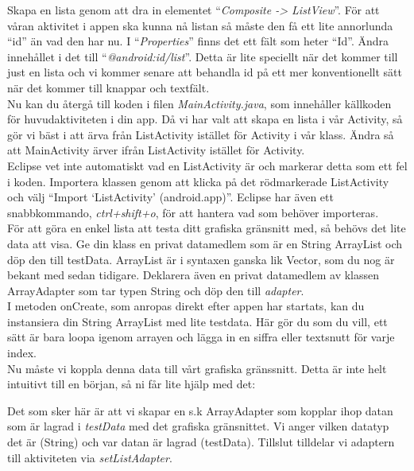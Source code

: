 \documentclass[11 pt, titlepage]{article} %
\begin{document}
Skapa en lista genom att dra in elementet “\textit{Composite -> ListView}”. För att våran aktivitet i appen ska kunna nå listan så måste den få ett lite annorlunda “id” än vad den har nu. I “\textit{Properties}” finns det ett fält som heter “Id”. Ändra innehållet i det till “\textit{@android:id/list}”. Detta är lite speciellt när det kommer till just en lista och vi kommer senare att behandla id på ett mer konventionellt sätt när det kommer till knappar och textfält.\\

Nu kan du återgå till koden i filen \textit{MainActivity.java}, som innehåller källkoden för huvudaktiviteten i din app.
Då vi har valt att skapa en lista i vår Activity, så gör vi bäst i att ärva från ListActivity istället för Activity i vår klass.
Ändra så att MainActivity ärver ifrån ListActivity istället för Activity. \\

Eclipse vet inte automatiskt vad en ListActivity är och markerar detta som ett fel i koden. Importera klassen genom att klicka på det rödmarkerade ListActivity och välj “Import ‘ListActivity’ (android.app)”. Eclipse har även ett snabbkommando, \textit{ctrl+shift+o}, för att hantera vad som behöver importeras.\\

För att göra en enkel lista att testa ditt grafiska gränsnitt med, så behövs det lite data att visa.
Ge din klass en privat datamedlem som är en String ArrayList och döp den till testData. ArrayList är i syntaxen ganska lik Vector, som du nog är bekant med sedan tidigare.
Deklarera även en privat datamedlem av klassen ArrayAdapter som tar typen String och döp den till \textit{adapter}.\\


I metoden onCreate, som anropas direkt efter appen har startats, kan du instansiera din String ArrayList med lite testdata. Här gör du som du vill, ett sätt är bara loopa igenom arrayen och lägga in en siffra eller textsnutt för varje index.\\

Nu måste vi koppla denna data till vårt grafiska gränssnitt. Detta är inte helt intuitivt till en början, så ni får lite hjälp med det:

Det som sker här är att vi skapar en s.k ArrayAdapter som kopplar ihop datan som är lagrad i \textit{testData} med det grafiska gränsnittet. Vi anger vilken datatyp det är (String) och var datan är lagrad (testData). Tillslut tilldelar vi adaptern till aktiviteten via \textit{setListAdapter}.\\
\end{document}
